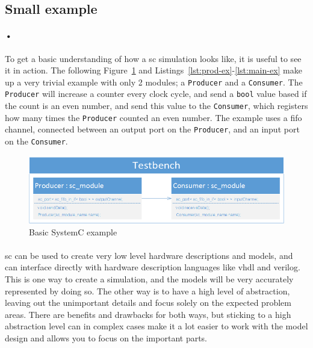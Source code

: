 \documentclass[a4paper]{report}
\newcommand{\codeword}[1]{\texttt{#1}}
\begin{document}
\newpage
\subsection{Small example}

\paragraph{•}
To get a basic understanding of how a \gls{sc} simulation looks like, it is useful to see it in action.
The following Figure~\ref{fig:sc-ex} and Listings~\ref{lst:prod-ex}-\ref{lst:main-ex} make up a very trivial example with only 2 modules; a \codeword{Producer} and a \codeword{Consumer}.
The \codeword{Producer} will increase a counter every clock cycle, and send a \codeword{bool} value based if the count is an even number, and send this value to the \codeword{Consumer}, which registers how many times the \codeword{Producer} counted an even number.
The example uses a \gls{fifo} channel, connected between an output port on the \codeword{Producer}, and an input port on the \codeword{Consumer}.

\begin{figure}[h!]
  \centering
    \includegraphics[width=1.0\textwidth]{images/sc-example.png}
     \caption{Basic SystemC example}
    \label{fig:sc-ex}
\end{figure}

\noindent
\begin{minipage}{\linewidth}

\end{minipage}
\begin{minipage}{\linewidth}

\end{minipage}
\begin{minipage}{\linewidth}

\end{minipage}

\paragraph{}
\gls{sc} can be used to create very low level hardware descriptions and models, and can interface directly with hardware description languages like \gls{vhdl} and \gls{verilog}.
This is one way to create a simulation, and the models will be very accurately represented by doing so.
The other way is to have a high level of abstraction, leaving out the unimportant details and focus solely on the expected problem areas.
There are benefits and drawbacks for both ways, but sticking to a high abstraction level can in complex cases make it a lot easier to work with the model design and allows you to focus on the important parts.
\end{document}
